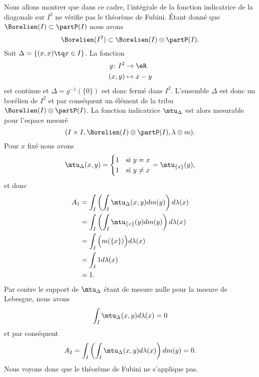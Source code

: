 \begin{example}
	Nous allons montrer que dans ce cadre, l'intégrale de la fonction indicatrice de la diagonale sur \( I^2\) ne vérifie pas le théorème de Fubini. Étant donné que \( \Borelien(I)\subset\partP(I)\) nous avons
	\begin{equation}
		\Borelien(I^2)\subset\Borelien(I)\otimes\partP(I).
	\end{equation}
	Soit \( \Delta=\{ (x,x)\tq x\in I \}\). La fonction
	\begin{equation}
		\begin{aligned}
			g\colon I^2 & \to \eR     \\
			(x,y)       & \mapsto x-y
		\end{aligned}
	\end{equation}
	est continue et \( \Delta=g^{-1}(\{ 0 \})\) est donc fermé dans \( I^2\). L'ensemble \( \Delta\) est donc un borélien de \( I^2\) et par conséquent un élément de la tribu \( \Borelien(I)\otimes\partP(I)\). La fonction indicatrice \( \mtu_{\Delta}\) est alors mesurable pour l'espace mesuré
	\begin{equation}
		(I\times I,\Borelien(I)\otimes\partP(I),\lambda\otimes m).
	\end{equation}
	Pour \( x\) fixé nous avons
	\begin{equation}
		\mtu_{\Delta}(x,y)=\begin{cases}
			1 & \text{si } y= x    \\
			1 & \text{si } y\neq x
		\end{cases}=\mtu_{\{ x \}}(y),
	\end{equation}
	et donc
	\begin{subequations}
		\begin{align}
			A_1 & =\int_I\left( \int_I\mtu_{\Delta}(x,y)dm(y) \right)d\lambda(x) \\
			    & =\int_I\left( \int_I\mtu_{\{ x \}}(y)dm(y) \right)d\lambda(x)  \\
			    & =\int_I\Big( m(\{ x \}) \Big)d\lambda(x)                       \\
			    & =\int_I 1d\lambda(x)                                           \\
			    & =1.
		\end{align}
	\end{subequations}
	Par contre le support de \( \mtu_{\Delta}\) étant de mesure nulle pour la mesure de Lebesgue, nous avons
	\begin{equation}
		\int_I\mtu_{\Delta}(x,y)d\lambda(x)=0
	\end{equation}
	et par conséquent
	\begin{equation}
		A_2=\int_I\left( \int_I\mtu_{\Delta}(x,y)d\lambda(x) \right)dm(y)=0.
	\end{equation}
	Nous voyons donc que le théorème de Fubini ne s'applique pas.
\end{example}


